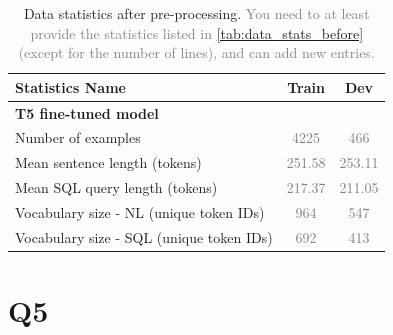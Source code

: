 \documentclass{article}
\begin{document}
\begin{table}[h!]
\centering
\begin{tabular}{lcc}
\toprule
Statistics Name & Train & Dev \\
\midrule
\multicolumn{3}{l}{\textbf{T5 fine-tuned model}} \\ %
Number of examples & \textcolor{gray}{4225} & \textcolor{gray}{466} \\
Mean sentence length (tokens)& \textcolor{gray}{251.58}& \textcolor{gray}{253.11} \\
Mean SQL query length (tokens)& \textcolor{gray}{217.37}& \textcolor{gray}{211.05}  \\
Vocabulary size - NL (unique token IDs)& \textcolor{gray}{964}& \textcolor{gray}{547}  \\
Vocabulary size - SQL (unique token IDs)& \textcolor{gray}{692}& \textcolor{gray}{413}  \\
\midrule
\bottomrule
\end{tabular}
\caption{Data statistics after pre-processing. \textcolor{gray}{You need to at least provide the statistics listed in \autoref{tab:data_stats_before} (except for the number of lines), and can add new entries.}}
\label{tab:data_stats_after}
\end{table}



\newpage




\section*{Q5}\label{sec:t5}
\end{document}
